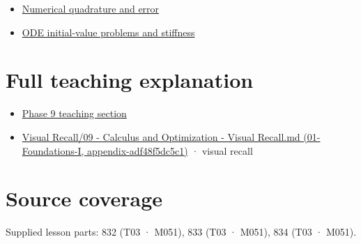 \begin{itemize}
\tightlist
\item
  \hyperref[appendix-80521eae6b71]{Numerical quadrature and error}
\item
  \hyperref[appendix-e8ab9836882e]{ODE initial-value problems and stiffness}
\end{itemize}

\section{Full teaching explanation}\label{appendix-1a50e72435c2-full-teaching-explanation}

\begin{itemize}
\tightlist
\item
  \href{Continuous\%20Notes/Computing\%20Foundations\%20-\%20From\%20Bits\%20to\%20C++\%20and\%20Systems\%20APIs\#Integration\%20and\%20quadrature}{Phase 9 teaching section}
\item
  \href{../01-Foundations-I/main.pdf\#nameddest=appendix-adf48f5dc5c1}{Visual Recall/09 - Calculus and Optimization - Visual Recall.md (01-Foundations-I, appendix-adf48f5dc5c1)} · visual recall
\end{itemize}

\section{Source coverage}\label{appendix-1a50e72435c2-source-coverage}

Supplied lesson parts: 832 (T03 · M051), 833 (T03 · M051), 834 (T03 · M051).
